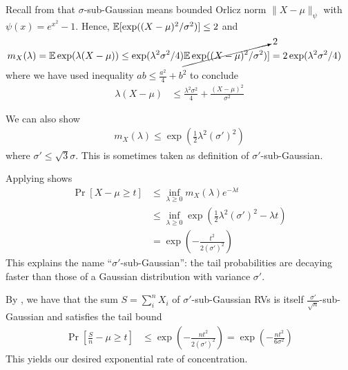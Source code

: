 \begin{example}\label{eg:sub-gaussian-chernoff}
    Recall from  that $\sigma$-sub-Gaussian means
    bounded Orlicz norm $\|X - \mu\|_\psi$ with $\psi(x) = e^{x^2} - 1$.
    Hence, $\mathbb{E}[\exp((X - \mu)^2 / \sigma^2)] \leq 2$ and
    \begin{align}
        m_X(\lambda)
        = \mathbb{E} \exp(\lambda (X - \mu))
        &\leq \exp(\lambda^2 \sigma^2 / 4) \cancelto{2}{\mathbb{E} \exp((X - \mu)^2 / \sigma^2)} ]
        = 2 \exp(\lambda^2 \sigma^2 / 4)
    \end{align}
    where we have used inequality $ab \leq \frac{a^2}{4} + b^2$ to conclude
    \begin{align}
        \lambda (X - \mu) &\leq \frac{\lambda^2 \sigma^2}{4} + \frac{(X - \mu)^2}{\sigma^2}
    \end{align}

    \begin{remark}
        We can also show
        \begin{align}
            m_X(\lambda)
            \leq \exp\left(\frac{1}{2} \lambda^2 (\sigma')^2\right)
        \end{align}
        where $\sigma' \leq \sqrt{3} \sigma$. This is sometimes taken as definition of $\sigma'$-sub-Gaussian.
    \end{remark}

    Applying  shows
    \begin{align}
        \Pr[X - \mu \geq t]
        &\leq \inf_{\lambda \geq 0} m_X(\lambda) e^{-\lambda t} \\
        &\leq \inf_{\lambda \geq 0} \exp\left( \frac{1}{2} \lambda^2 (\sigma')^2 - \lambda t \right) \\
        &= \exp\left( -\frac{t^2}{2 (\sigma')^2}\right)
    \end{align}
    This explains the name ``$\sigma'$-sub-Gaussian'': the tail probabilities are decaying faster than those of a Gaussian
    distribution with variance $\sigma'$.

    By , we have that the sum $S = \sum_i^n X_i$ of $\sigma'$-sub-Gaussian RVs
    is itself $\frac{\sigma'}{\sqrt{n}}$-sub-Gaussian and
    satisfies the tail bound
    \begin{align}
        \Pr\left[\frac{S}{n} - \mu \geq t\right]
        &\leq \exp\left( - \frac{n t^2}{2 (\sigma')^2} \right)
        = \exp\left( - \frac{n t^2}{6 \sigma^2} \right) \label{eq:sum-sub-gaussian-tail-bound}
    \end{align}
    This yields our desired exponential rate of concentration.
\end{example}

